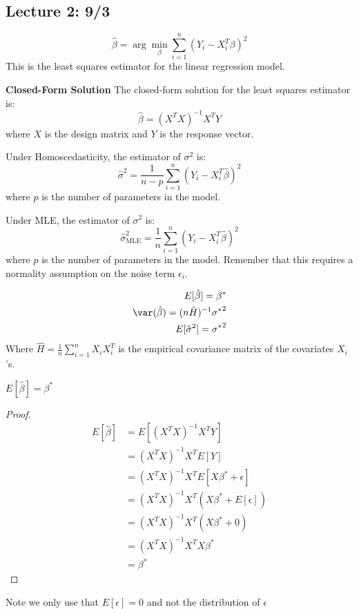 \documentclass[answers,12pt,addpoints]{exam}
\begin{document}
\subsection{Lecture 2: 9/3}
\begin{remark}
    [Estimation: LS]
    $$\hat{\beta} = \arg \min_{\beta} \sum_{i=1}^{n} (Y_i - X_i^T \beta)^2$$
    This is the least squares estimator for the linear regression model.

    \textbf{Closed-Form Solution}
    The closed-form solution for the least squares estimator is:
    $$\hat{\beta} = (X^T X)^{-1} X^T Y$$
    where $X$ is the design matrix and $Y$ is the response vector.
\end{remark}
\begin{remark}
    Under Homoscedasticity, the estimator of $\sigma^2$ is:
    $$\hat{\sigma}^2 = \frac{1}{n-p} \sum_{i=1}^{n} (Y_i - X_i^T \hat{\beta})^2$$
    where $p$ is the number of parameters in the model.

    Under MLE, the estimator of $\sigma^2$ is:
    $$\hat{\sigma}_\text{MLE}^2 = \frac{1}{n} \sum_{i=1}^{n} (Y_i - X_i^T \hat{\beta})^2$$
    where $p$ is the number of parameters in the model. Remember that this requires a normality assumption on the noise term $\epsilon_i$.
\end{remark}
\begin{proposition}
    \begin{align*}
        E[\hat{\beta}] = \beta^*\\
        \var(\hat{\beta}) = (n\hat{H})^{-1}{\sigma^*}^2\\
        E[\hat{\sigma}^2] = {\sigma^*}^2
    \end{align*}
    Where $\hat{H} = \frac{1}{n} \sum_{i=1}^{n} X_i X_i^T$ is the empirical covariance matrix of the covariates $X_i$'s.
\end{proposition}
\begin{remark}
    $E[\hat{\beta}] = \beta^*$
    \begin{proof}
        \begin{align*}
            E[\hat{\beta}] &= E[(X^T X)^{-1} X^T Y]\\
            &= (X^T X)^{-1} X^T E[Y]\\
            &= (X^T X)^{-1} X^T E[X \beta^* + \epsilon]\\
            &= (X^T X)^{-1} X^T (X \beta^* + E[\epsilon])\\
            &= (X^T X)^{-1} X^T (X \beta^* + 0)\\
            &= (X^T X)^{-1} X^T X \beta^*\\
            &= \beta^*
        \end{align*}
    \end{proof}
    Note we only use that $E[\epsilon] = 0$ and not the distribution of $\epsilon$
\end{remark}
\end{document}
